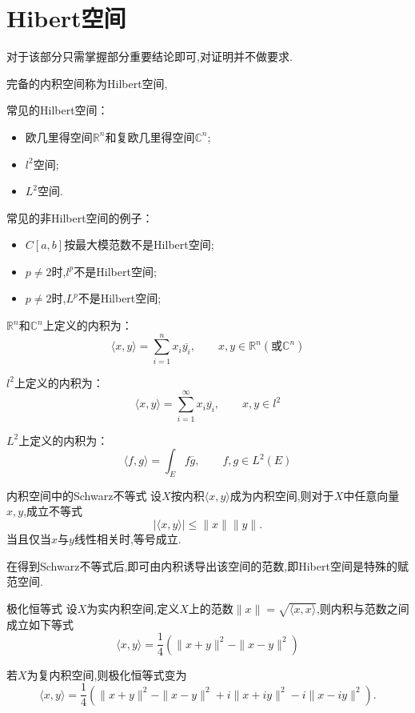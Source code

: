 \documentclass[lang=cn,18pt]{elegantbook}
\begin{document}
\chapter{Hibert空间}
\begin{note}
    对于该部分只需掌握部分重要结论即可,对证明并不做要求.
\end{note}
\begin{definition}
    完备的内积空间称为Hilbert空间,
\end{definition}
\begin{conclusion}
    常见的Hilbert空间：
    \begin{itemize}
        \item 欧几里得空间$\mathbb{R}^n$和复欧几里得空间$\mathbb{C}^n$;
        \item $l^2$空间;
        \item $L^2$空间.
    \end{itemize}
    \quad\quad 常见的非Hilbert空间的例子：
    \begin{itemize}
        \item $C[a,b]$按最大模范数不是Hilbert空间;
        \item $p \not=2$时,$l^p$不是Hilbert空间;
        \item $p \not=2$时,$L^p$不是Hilbert空间;
    \end{itemize}
\end{conclusion}
\begin{note}
    $\mathbb{R}^n$和$\mathbb{C}^n$上定义的内积为：
    $$\langle x,y \rangle=\sum\limits_{i=1}^{n}x_i \overline{y_i}, \quad\quad x,y \in \mathbb{R}^n (\text{或}\mathbb{C}^n)$$

    $l^2$上定义的内积为：
    $$\langle x,y \rangle=\sum\limits_{i=1}^{\infty}x_i \overline{y_i}, \quad\quad x,y \in l^2$$

    $L^2$上定义的内积为：
    $$\langle f,g \rangle=\int_{E}f \overline{g}, \quad\quad f,g \in L^2(E)$$
\end{note}


\begin{lemma}{内积空间中的Schwarz不等式}
    设$X$按内积$\langle x,y \rangle$成为内积空间,则对于$X$中任意向量$x,y$,成立不等式
    $$|\langle x,y \rangle|\leqslant \|x\|\|y\|.$$
    当且仅当$x$与$y$线性相关时,等号成立.
\end{lemma}
\begin{note}
    在得到Schwarz不等式后,即可由内积诱导出该空间的范数,即Hibert空间是特殊的赋范空间.
\end{note}
\begin{lemma}{极化恒等式}
设$X$为实内积空间,定义$X$上的范数$\|x\|=\sqrt{\langle x,x \rangle}$,则内积与范数之间成立如下等式
    $$\langle x,y \rangle=\frac{1}{4}\left(\|x+y\|^2 -\|x-y\|^2 \right)$$
\end{lemma}
\begin{note}
    若$X$为复内积空间,则极化恒等式变为
    $$\langle x,y \rangle=\frac{1}{4}\left(\|x+y\|^2 -\|x-y\|^2+i\|x+iy\|^2 -i\|x-iy\|^2 \right).$$
\end{note}
\end{document}
